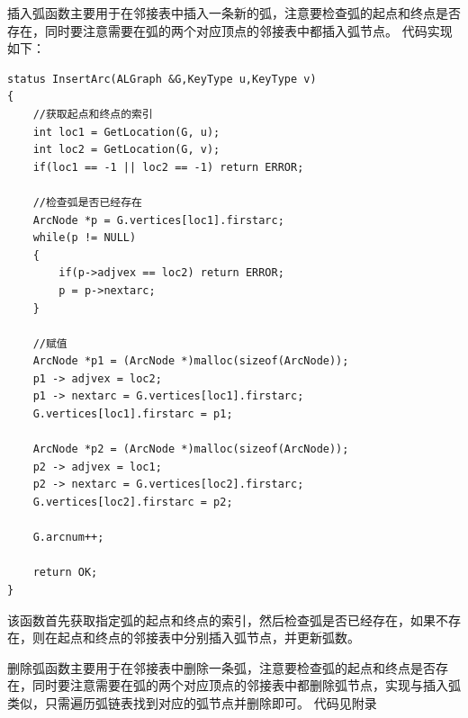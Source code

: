 \documentclass[supercite]{Experimental_Report}
\theoremstyle{definition}
\begin{document}
	插入弧函数主要用于在邻接表中插入一条新的弧，注意要检查弧的起点和终点是否存在，同时要注意需要在弧的两个对应顶点的邻接表中都插入弧节点。
	代码实现如下：
\begin{lstlisting}[caption={插入弧}, label=lst:insert_arc]
status InsertArc(ALGraph &G,KeyType u,KeyType v)
{
	//获取起点和终点的索引
	int loc1 = GetLocation(G, u);
	int loc2 = GetLocation(G, v);
	if(loc1 == -1 || loc2 == -1) return ERROR;

	//检查弧是否已经存在
	ArcNode *p = G.vertices[loc1].firstarc;
	while(p != NULL)
	{
		if(p->adjvex == loc2) return ERROR;
		p = p->nextarc;
	}

	//赋值
	ArcNode *p1 = (ArcNode *)malloc(sizeof(ArcNode));
	p1 -> adjvex = loc2;
	p1 -> nextarc = G.vertices[loc1].firstarc;
	G.vertices[loc1].firstarc = p1;

	ArcNode *p2 = (ArcNode *)malloc(sizeof(ArcNode));
	p2 -> adjvex = loc1;
	p2 -> nextarc = G.vertices[loc2].firstarc;
	G.vertices[loc2].firstarc = p2;

	G.arcnum++;

	return OK;
}
\end{lstlisting}
	该函数首先获取指定弧的起点和终点的索引，然后检查弧是否已经存在，如果不存在，则在起点和终点的邻接表中分别插入弧节点，并更新弧数。

	删除弧函数主要用于在邻接表中删除一条弧，注意要检查弧的起点和终点是否存在，同时要注意需要在弧的两个对应顶点的邻接表中都删除弧节点，实现与插入弧类似，只需遍历弧链表找到对应的弧节点并删除即可。
	代码见附录
	
\end{document}
